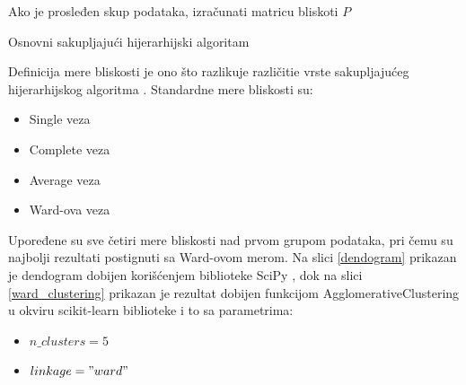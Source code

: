 \documentclass[a4paper]{article}
\begin{document}
\begin{minipage}{1\linewidth}%
\begin{algorithm}[H]
\SetAlgoLined
{}
Ako je prosleđen skup podataka, izračunati matricu bliskoti $P$\;
 \caption{Osnovni sakupljajući hijerarhijski algoritam}
\end{algorithm}
\end{minipage}

\verb||

Definicija mere bliskosti je ono što razlikuje različitie vrste sakupljajućeg hijerarhijskog algoritma \cite{tan2016introduction}. Standardne mere bliskosti su:
\begin{itemize}
\item Single veza
\item Complete veza
\item Average veza
\item Ward-ova veza
\end{itemize}

Upoređene su sve četiri mere bliskosti nad prvom grupom podataka, pri čemu su najbolji rezultati postignuti sa Ward-ovom merom. Na slici \ref{dendogram} prikazan je dendogram dobijen korišćenjem biblioteke SciPy \cite{2020SciPy-NMeth}, dok na slici \ref{ward_clustering} prikazan je rezultat dobijen funkcijom AgglomerativeClustering u okviru scikit-learn biblioteke i to sa parametrima:
\begin{itemize}
\item $n\_clusters = 5$
\item $linkage = "ward"$
\end{itemize}
\end{document}
